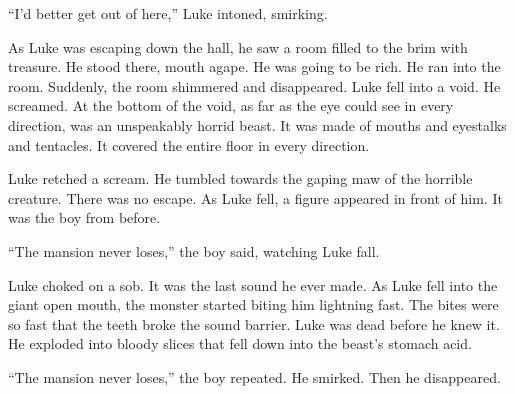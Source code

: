 ``I'd better get out of here,'' Luke intoned,
smirking.



As Luke was escaping down the hall, he saw a room filled to the
brim with treasure. He stood there, mouth agape. He was going to be
rich. He ran into the room. Suddenly, the room shimmered and
disappeared. Luke fell into a void. He screamed. At the bottom of
the void, as far as the eye could see in every direction, was an
unspeakably horrid beast. It was made of mouths and eyestalks and
tentacles. It covered the entire floor in every direction.



Luke retched a scream. He tumbled towards the gaping maw of the
horrible creature. There was no escape. As Luke fell, a figure
appeared in front of him. It was the boy from before.



``The mansion never loses,'' the boy said, watching Luke
fall.



Luke choked on a sob. It was the last sound he ever made. As Luke
fell into the giant open mouth, the monster started biting him
lightning fast. The bites were so fast that the teeth broke the
sound barrier. Luke was dead before he knew it. He exploded into
bloody slices that fell down into the beast's stomach
acid.



``The mansion never loses,'' the boy repeated. He
smirked. Then he disappeared.


 




